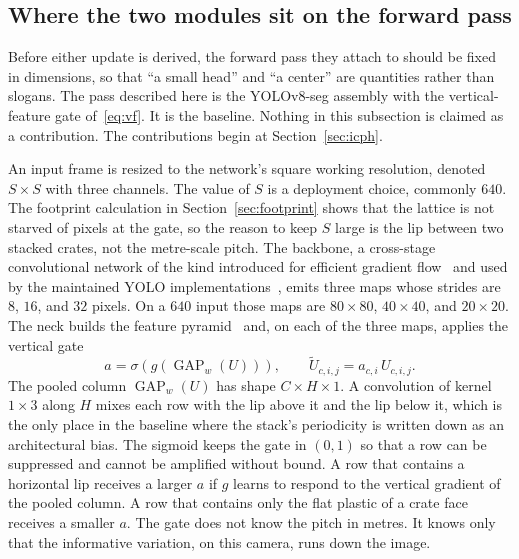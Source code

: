 \subsection{Where the two modules sit on the forward pass}

Before either update is derived, the forward pass they attach to should be fixed in dimensions, so that ``a small head'' and ``a center'' are quantities rather than slogans. The pass described here is the YOLOv8-seg assembly with the vertical-feature gate of~\eqref{eq:vf}. It is the baseline. Nothing in this subsection is claimed as a contribution. The contributions begin at Section~\ref{sec:icph}.

An input frame is resized to the network's square working resolution, denoted $S\times S$ with three channels. The value of $S$ is a deployment choice, commonly $640$. The footprint calculation in Section~\ref{sec:footprint} shows that the lattice is not starved of pixels at the gate, so the reason to keep $S$ large is the lip between two stacked crates, not the metre-scale pitch. The backbone, a cross-stage convolutional network of the kind introduced for efficient gradient flow~\cite{wang2020cspnet} and used by the maintained YOLO implementations~\cite{jocher2023yolov8}, emits three maps whose strides are $8$, $16$, and $32$ pixels. On a $640$ input those maps are $80\times 80$, $40\times 40$, and $20\times 20$. The neck builds the feature pyramid~\cite{lin2017fpn} and, on each of the three maps, applies the vertical gate
\begin{equation}
a = \sigma\!\left( g(\operatorname{GAP}_{w}(U)) \right),
\qquad
\tilde U_{c,i,j} = a_{c,i}\, U_{c,i,j}.
\label{eq:vf-again}
\end{equation}
The pooled column $\operatorname{GAP}_{w}(U)$ has shape $C\times H\times 1$. A convolution of kernel $1\times 3$ along $H$ mixes each row with the lip above it and the lip below it, which is the only place in the baseline where the stack's periodicity is written down as an architectural bias. The sigmoid keeps the gate in $(0,1)$ so that a row can be suppressed and cannot be amplified without bound. A row that contains a horizontal lip receives a larger $a$ if $g$ learns to respond to the vertical gradient of the pooled column. A row that contains only the flat plastic of a crate face receives a smaller $a$. The gate does not know the pitch in metres. It knows only that the informative variation, on this camera, runs down the image.

